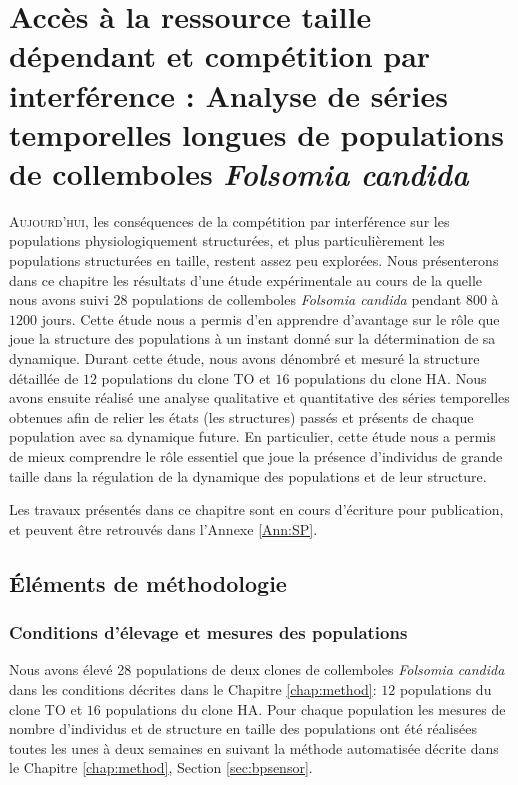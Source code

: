\chapter{Accès à la ressource taille dépendant et compétition par interférence :
Analyse de séries temporelles longues de populations de collemboles \textit{Folsomia candida}}
\label{chap:sp}

\vspace{5cm}

\lettrine[lines=3]{A}{ujourd'hui}, les conséquences de la compétition par
interférence sur les populations physiologiquement structurées, et plus
particulièrement les populations structurées en taille, restent assez peu
explorées. Nous présenterons dans ce chapitre les résultats d'une étude
expérimentale au cours de la quelle nous avons suivi 28 populations de
collemboles \textit{Folsomia candida} pendant $800$ à $1200$ jours. Cette étude
nous a permis d'en apprendre d'avantage sur le rôle que joue la structure des
populations à un instant donné sur la détermination de sa dynamique. Durant
cette étude, nous avons dénombré et mesuré la structure détaillée de $12$
populations du clone TO et $16$ populations du clone HA. Nous avons ensuite
réalisé une analyse qualitative et quantitative des séries temporelles obtenues
afin de relier les états (les structures) passés et présents de chaque
population avec sa dynamique future.
En particulier, cette étude nous a permis de mieux comprendre le rôle essentiel
que joue la présence d'individus de grande taille dans la régulation de la
dynamique des populations et de leur structure.

Les travaux présentés dans ce chapitre sont en cours d'écriture pour
publication, et peuvent être retrouvés dans l'Annexe \ref{Ann:SP}.

\section{Éléments de méthodologie}

\subsection{Conditions d'élevage et mesures des populations}

Nous avons élevé 28 populations de deux clones de
collemboles \textit{Folsomia candida} dans les conditions décrites dans le
Chapitre \ref{chap:method}: $12$ populations du clone TO et $16$
populations du clone HA. Pour chaque population les mesures de nombre
d'individus et de structure en taille des populations ont été réalisées toutes
les unes à deux semaines en suivant la méthode automatisée décrite dans le
Chapitre \ref{chap:method}, Section \ref{sec:bpsensor}.

